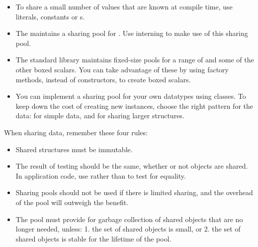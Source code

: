 \begin{itemize}
  \item To share a small number of values that are known at compile time, use
   literals,  constants or s.
  \item The \jre maintains a sharing
  pool for . Use  interning to make use of this
  sharing pool.
  \item The standard library maintains fixed-size pools for
   a range of  and some of the other boxed scalars. You
   can take advantage of these by using  factory methods, instead
   of constructors, to create boxed scalars.
   \item You can implement a sharing pool for your own datatypes using
    classes. To keep down the cost of creating new instances, choose
   the right pattern for the data:  for
   simple data, and  for sharing larger structures.
\end{itemize}


When sharing data, remember these four rules:
\begin{itemize}
  \item Shared structures must be immutable.
  \item The result of  testing should be the same, whether or
not objects are shared. In application code, use  rather than
\code{==} to test for equality.
  \item Sharing pools should not be used if there is limited sharing, and the
  overhead of the pool will outweigh the benefit.
  \item The pool must provide for garbage collection of shared objects
  that are no longer needed, unless: 1. the set of shared objects is
  small, or 2. the set of shared objects is stable for the lifetime of the
  pool.
\end{itemize}





